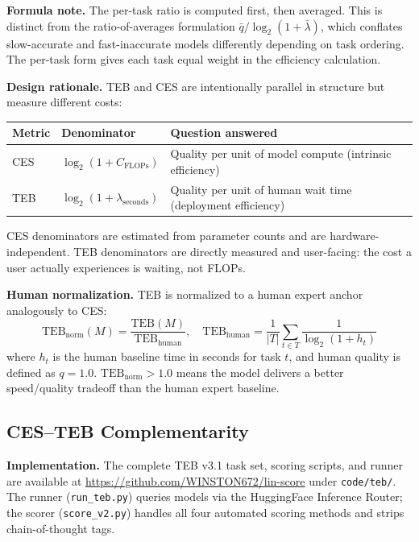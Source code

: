 \documentclass[12pt]{article}
\begin{document}
\textbf{Formula note.} The per-task ratio is computed first, then averaged. This is distinct from the ratio-of-averages formulation $\bar{q}/\log_2(1+\bar{\lambda})$, which conflates slow-accurate and fast-inaccurate models differently depending on task ordering. The per-task form gives each task equal weight in the efficiency calculation.

\textbf{Design rationale.} TEB and CES are intentionally parallel in structure but measure different costs:

\begin{center}
\begin{tabular}{lll}
\toprule
\textbf{Metric} & \textbf{Denominator} & \textbf{Question answered} \\
\midrule
CES & $\log_2(1 + C_{\text{FLOPs}})$ & Quality per unit of model compute (intrinsic efficiency) \\
TEB & $\log_2(1 + \lambda_{\text{seconds}})$ & Quality per unit of human wait time (deployment efficiency) \\
\bottomrule
\end{tabular}
\end{center}

CES denominators are estimated from parameter counts and are hardware-independent. TEB denominators are directly measured and user-facing: the cost a user actually experiences is waiting, not FLOPs.

\textbf{Human normalization.} TEB is normalized to a human expert anchor analogously to CES:
\begin{equation}
\mathrm{TEB}_{\text{norm}}(M) = \frac{\mathrm{TEB}(M)}{\mathrm{TEB}_{\text{human}}}, \quad
\mathrm{TEB}_{\text{human}} = \frac{1}{|T|}\sum_{t \in T} \frac{1}{\log_2(1 + h_t)}
\end{equation}
where $h_t$ is the human baseline time in seconds for task $t$, and human quality is defined as $q = 1.0$. $\mathrm{TEB}_{\text{norm}} > 1.0$ means the model delivers a better speed/quality tradeoff than the human expert baseline.

\subsection{CES--TEB Complementarity}

\textbf{Implementation.} The complete TEB v3.1 task set, scoring scripts, and runner are available at \url{https://github.com/WINSTON672/lin-score} under \texttt{code/teb/}. The runner (\texttt{run\_teb.py}) queries models via the HuggingFace Inference Router; the scorer (\texttt{score\_v2.py}) handles all four automated scoring methods and strips chain-of-thought tags.
\end{document}
